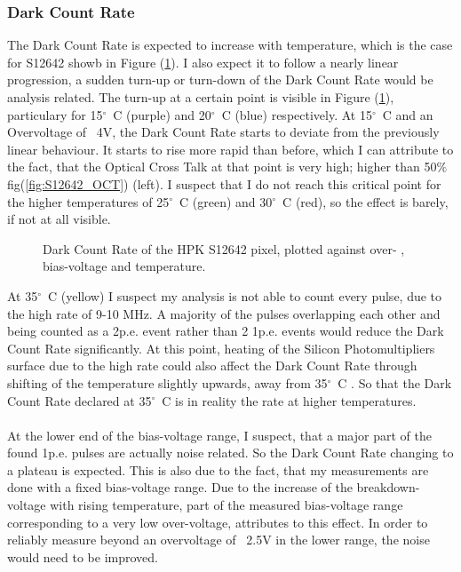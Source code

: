 \documentclass[12pt,article,type=msc,colorback,accentcolor=tud9c]{tudthesis}
\begin{document}
\subsubsection{Dark Count Rate}
The Dark Count Rate is expected to increase with temperature, which is the case for S12642 showb in Figure (\ref{fig:S12642_DCR}). I also expect it to follow a nearly linear progression, a sudden turn-up or turn-down of the Dark Count Rate would be analysis related. The turn-up at a certain point is visible in Figure (\ref{fig:S12642_DCR}), particulary for 15$^{\circ}$~C (purple) and 20$^{\circ}$~C (blue) respectively. At 15$^{\circ}$~C and an Overvoltage of ~4V, the Dark Count Rate starts to deviate from the previously linear behaviour. It starts to rise more rapid than before, which I can attribute to the fact, that the Optical Cross Talk at that point is very high; higher than 50$\%$  fig(\ref{fig:S12642_OCT}) (left). I suspect that I do not reach this critical point for the higher temperatures of 25$^{\circ}$~C (green) and 30$^{\circ}$~C (red), so the effect is barely, if not at all visible. 
\begin{figure}[h]
\begin{centering}
\caption{Dark Count Rate of the HPK S12642 pixel, plotted against over- , bias-voltage and temperature. }
\label{fig:S12642_DCR}
\end{centering}
\end{figure}
At 35$^{\circ}$~C (yellow) I suspect my analysis is not able to count every pulse, due to the high rate of 9-10 MHz. A majority of the pulses overlapping each other and being counted as a 2p.e. event rather than 2 1p.e. events would reduce the Dark Count Rate significantly. At this point, heating of the Silicon Photomultipliers surface due to the high rate could also affect the Dark Count Rate through shifting of the temperature slightly upwards, away from 35${^\circ}$~C . So that the Dark Count Rate declared at 35${^\circ}$~C is in reality the rate at higher temperatures. \\\\
At the lower end of the bias-voltage range, I suspect, that a major part of the found 1p.e. pulses are actually noise related. So the Dark Count Rate changing to a plateau is expected. This is also due to the fact, that my measurements are done with a fixed bias-voltage range. Due to the increase of the breakdown-voltage with rising temperature, part of the measured bias-voltage range corresponding to a very low over-voltage, attributes to this effect. In order to reliably measure beyond an overvoltage of ~2.5V in the lower range, the noise would need to be improved.  
\end{document}
